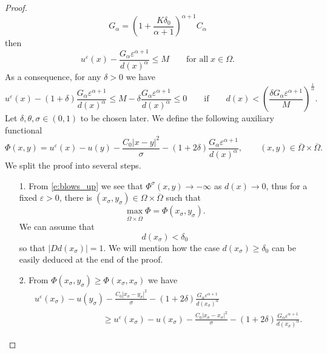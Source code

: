 \documentclass[11pt,reqno]{amsart}
\numberwithin{figure}{section}
\theoremstyle{plain}
\theoremstyle{remark}
\numberwithin{equation}{section}
\begin{document}
\begin{proof}
\begin{equation*}
    G_\alpha = \left(1+\frac{K\delta_0}{\alpha+1}\right)^{\alpha+1}C_\alpha
\end{equation*}
then 
\begin{equation*}
    u^\varepsilon(x) - \frac{G_\alpha\varepsilon^{\alpha+1}}{d(x)^\alpha} \leq M \qquad\text{for all}\; x\in \Omega.
\end{equation*}
As a consequence, for any $\delta>0$ we have
\begin{equation*}
    u^\varepsilon(x) - (1+\delta) \frac{G_\alpha \varepsilon^{\alpha+1}}{d(x)^{\alpha}} \leq  M - \delta\frac{G_\alpha \varepsilon^{\alpha+1}}{d(x)^{\alpha}}\leq 0 \qquad\text{if}\qquad d(x)< \left(\frac{\delta G_\alpha\varepsilon^{\alpha+1}}{M}\right)^{\frac{1}{\alpha}}.
\end{equation*}
Let $\delta,\theta,\sigma\in (0,1)$ to be chosen later. We define the following auxiliary functional
\begin{equation*}
    \Phi(x,y) =  u^\varepsilon(x) - u(y) - \frac{C_0|x-y|^2}{\sigma}- \left(1+2\delta\right)\frac{G_\alpha\varepsilon^{\alpha+1}}{d(x)^{\alpha}}, \qquad (x,y)\in \overline{\Omega}\times\overline{\Omega}.
\end{equation*}
We split the proof into several steps.
\begin{enumerate}
    \item[1.] From \eqref{e:blows_up} we see that $\Phi^\sigma(x,y)\to -\infty$ as $d(x)\to 0$, thus for a fixed $\varepsilon>0$, there is $(x_{\sigma},y_\sigma)\in \Omega\times\overline{\Omega}$ such that 
    \begin{equation*}
        \max_{\overline{\Omega}\times \overline{\Omega}} \Phi = \Phi(x_\sigma,y_\sigma).
    \end{equation*}
    We can assume that 
    \begin{equation}\label{e:ass_delta0}
        d(x_\sigma) < \delta_0
    \end{equation}
    so that $|Dd(x_\sigma)| = 1$. We will mention how the case $d(x_\sigma)\geq \delta_0$ can be easily deduced at the end of the proof.
    \item[2.] From $\Phi(x_\sigma,y_\sigma)\geq \Phi(x_\sigma,x_\sigma)$ we have
    \begin{align*}
        & u^\varepsilon(x_\sigma) - u(y_\sigma) - \frac{C_0|x_\sigma-y_\sigma |^2}{\sigma}- \left(1+2\delta\right)\frac{G_\alpha\varepsilon^{\alpha+1}}{d(x_\sigma)^{\alpha}} \\
        & \qquad\qquad\qquad\qquad \geq u^\varepsilon(x_\sigma) - u(x_\sigma) - \frac{C_0|x_\sigma-x_\sigma |^2}{\sigma}- \left(1+2\delta\right)\frac{G_\alpha\varepsilon^{\alpha+1}}{d(x_\sigma)^{\alpha}}.

\end{align*}
\end{enumerate}
\end{proof}
\end{document}
